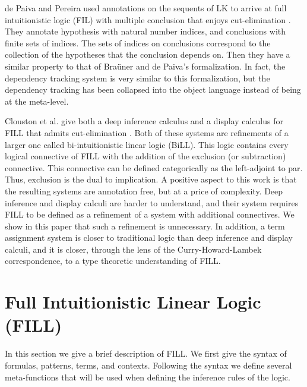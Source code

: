 de Paiva and Pereira used annotations on the sequents of LK to arrive
at full intuitionistic logic (FIL) with multiple conclusion that
enjoys cut-elimination \cite{dePaiva:2005}. They annotate hypothesis
with natural number indices, and conclusions with finite sets of
indices.  The sets of indices on conclusions correspond to the
collection of the hypotheses that the conclusion depends on.  Then
they have a similar property to that of Bra\"uner and de Paiva's
formalization.  In fact, the dependency tracking system is very
similar to this formalization, but the dependency tracking has been
collapsed into the object language instead of being at the meta-level.

Clouston et al. give both a deep inference calculus and a display
calculus for FILL that admits cut-elimination \cite{Clouston:2013}.
Both of these systems are refinements of a larger one called
bi-intuitionistic linear logic (BiLL).  This logic contains every
logical connective of FILL with the addition of the exclusion (or
subtraction) connective.  This connective can be defined categorically
as the left-adjoint to par.  Thus, exclusion is the dual to
implication.  A positive aspect to this work is that the resulting
systems are annotation free, but at a price of complexity.  Deep
inference and display calculi are harder to understand, and their
system requires FILL to be defined as a refinement of a system with
additional connectives.  We show in this paper that such a refinement
is unnecessary.  In addition, a term assignment system is closer to
traditional logic than deep inference and display calculi, and it is
closer, through the lens of the Curry-Howard-Lambek correspondence, to
a type theoretic understanding of FILL.

\section{Full Intuitionistic Linear Logic (FILL)}
\label{sec:full_intuitionistic_linear_logic_(fill)}

In this section we give a brief description of FILL.  We first give
the syntax of formulas, patterns, terms, and contexts.  Following the
syntax we define several meta-functions that will be used when
defining the inference rules of the logic.

